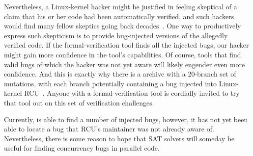 Nevertheless, a Linux-kernel hacker might be justified in feeling skeptical
of a claim that his or her code had been automatically verified, and
such hackers would find many fellow skeptics going back
decades~\cite{DeMillo:1979:SPP:359104.359106}.
One way to productively express such skepticism is to provide bug-injected
versions of the allegedly verified code.
If the formal-verification tool finds all the injected bugs, our hacker
might gain more confidence in the tool's capabilities.
Of course, tools that find valid bugs of which the hacker was not yet aware
will likely engender even more confidence.
And this is exactly why there is a  archive with a 20-branch set
of mutations, with each branch potentially containing a bug injected
into Linux-kernel RCU~\cite{PaulEMcKenney2017VerificationChallenge6}.
Anyone with a formal-verification tool is cordially invited to try that
tool out on this set of verification challenges.

Currently,  is able to find a number of injected bugs,
however, it has not yet been able to locate a bug that RCU's
maintainer was not already aware of.
Nevertheless, there is some reason to hope that SAT solvers will someday
be useful for finding concurrency bugs in parallel code.
\fi
